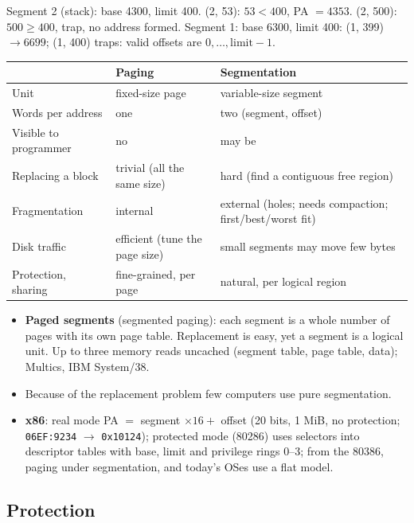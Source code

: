 \begin{eg}
Segment 2 (stack): base 4300, limit 400. (2, 53): $53<400$, PA $=4353$. (2, 500):
$500\ge400$, trap, no address formed. Segment 1: base 6300, limit 400: (1, 399)
$\to6699$; (1, 400) traps: valid offsets are $0,\dots,\text{limit}-1$.
\end{eg}

\begin{center}
\small
\begin{tabular}{@{}lP{5.8cm}P{5.8cm}@{}}
\toprule
& Paging & Segmentation \\
\midrule
Unit & fixed-size page & variable-size segment \\
Words per address & one & two (segment, offset) \\
Visible to programmer & no & may be \\
Replacing a block & trivial (all the same size) & hard (find a contiguous free region) \\
Fragmentation & internal & external (holes; needs compaction; first/best/worst fit) \\
Disk traffic & efficient (tune the page size) & small segments may move few bytes \\
Protection, sharing & fine-grained, per page & natural, per logical region \\
\bottomrule
\end{tabular}
\end{center}
\begin{itemize}
  \item \textbf{Paged segments} (segmented paging): each segment is a whole number
  of pages with its own page table. Replacement is easy, yet a segment is a logical
  unit. Up to three memory reads uncached (segment table, page table, data);
  Multics, IBM System/38.
  \item Because of the replacement problem few computers use pure segmentation.
  \item \textbf{x86}: real mode PA $=$ segment $\times16+$ offset (20 bits, 1 MiB,
  no protection; \texttt{06EF:9234} $\to$ \texttt{0x10124}); protected mode
  (80286) uses selectors into descriptor tables with base, limit and privilege
  rings 0--3; from the 80386, paging under segmentation, and today's OSes use a
  flat model.
\end{itemize}

\subsection{Protection}
\label{sec:protection}

